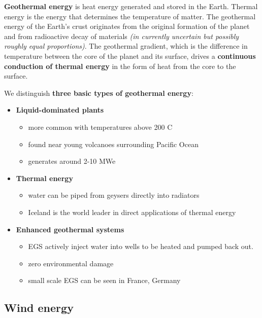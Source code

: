 \documentclass[11pt, titlepage]{article}
\begin{document}
		\textbf{Geothermal energy} is heat energy generated and stored in the Earth. Thermal energy is the energy that determines the temperature of matter. The geothermal energy of the Earth's crust originates from the original formation of the planet and from radioactive decay of materials \textit{(in currently uncertain but possibly roughly equal proportions)}. The geothermal gradient, which is the difference in temperature between the core of the planet and its surface, drives a \textbf{continuous conduction of thermal energy} in the form of heat from the core to the surface.

		\vspace{0.5cm}
		We distinguish \textbf{three basic types of geothermal energy}:
		\newline


		\begin{itemize}
			\item \textbf{Liquid-dominated plants}
			\begin{itemize}
				\item more common with temperatures above 200 \degree C
				\item found near young volcanoes surrounding Pacific Ocean
				\item generates around 2-10 MWe
			\end{itemize}
			\item \textbf{Thermal energy}
			\begin{itemize}
				\item water can be piped from geysers directly into radiators
				\item Iceland is the world leader in direct applications of thermal energy
			\end{itemize}
			\item \textbf{Enhanced geothermal systems}
			\begin{itemize}
				\item EGS actively inject water into wells to be heated and pumped back out.
				\item zero environmental damage
				\item small scale EGS can be seen in France, Germany
			\end{itemize}
		\end{itemize}


	\subsection{Wind energy}
\end{document}
